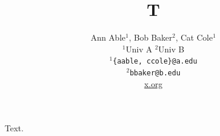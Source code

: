 \documentclass{article}
\title{T}
\author{Ann Able$^1$, Bob Baker$^2$, Cat Cole$^1$ \\
$^1$Univ A \quad $^2$Univ B \\
{\tt $^1$\{aable, ccole\}@a.edu} \\
{\tt $^2$bbaker@b.edu} \\
\href{https://x.org}{x.org}}
\begin{document}
\maketitle
Text.
\end{document}
